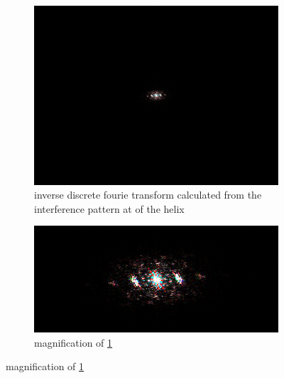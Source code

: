 \begin{figure}[H]
    \centering
    \begin{subfigure}{0.48\columnwidth}
        \centering
        \includegraphics[width=0.9\columnwidth]{figures/expantion fourie transform.png}
        \caption{inverse discrete fourie transform calculated from the interference pattern at of the helix }
        \label{fig:expansion inverse fourie transform measured}
    \end{subfigure}\hfill
    \begin{subfigure}{0.48\columnwidth}
        \centering
        \includegraphics[width=\columnwidth]{figures/expantion fourie transform magnified.png} %
        \caption{magnification of \ref{fig:expansion inverse fourie transform measured}}
        \label{fig:expansion fourie transform magnified}
    \end{subfigure}

    \label{fig:expansion theory measurements}
\end{figure}
